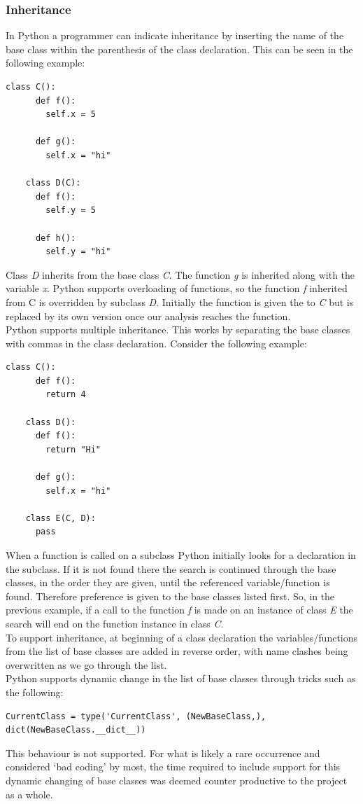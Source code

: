 \documentclass[12pt, titlepage]{article}
\begin{document}
\subsubsection{Inheritance}
In Python a programmer can indicate inheritance by inserting the name of the base class within the parenthesis of the class declaration. This can be seen in the following example:
\begin{lstlisting}[mathescape]
	class C():
	  def f():
	    self.x = 5
		
	  def g():
	    self.x = "hi"

	class D(C):
	  def f():
	    self.y = 5
		
	  def h():
	    self.y = "hi"
\end{lstlisting}
Class \textit{D} inherits from the base class \textit{C}. The function \textit{g} is inherited along with the variable \textit{x}. Python supports overloading of functions, so the function \textit{f} inherited from C is overridden by subclass \textit{D}. Initially the function is given the to \textit{C} but is replaced by its own version once our analysis reaches the function. \\
Python supports multiple inheritance. This works by separating the base classes with commas in the class declaration. Consider the following example: 
\begin{lstlisting}[mathescape]
	class C():
	  def f():
	    return 4
	    
	class D():
	  def f():
	    return "Hi"
	    
	  def g():
	    self.x = "hi"

	class E(C, D):
	  pass
\end{lstlisting}
When a function is called on a subclass Python initially looks for a declaration in the subclass. If it is not found there the search is continued through the base classes, in the order they are given, until the referenced variable/function is found. Therefore preference is given to the base classes listed first. So, in the previous example, if a call to the function \textit{f} is made on an instance of class \textit{E} the search will end on the function instance in class \textit{C}. \\
To support inheritance, at beginning of a class declaration the variables/functions from the list of base classes are added in reverse order, with name clashes being overwritten as we go through the list. \\
Python supports dynamic change in the list of base classes through tricks such as the following:
\begin{lstlisting}[mathescape]
CurrentClass = type('CurrentClass', (NewBaseClass,), dict(NewBaseClass.__dict__))
\end{lstlisting}
This behaviour is not supported. For what is likely a rare occurrence and considered `bad coding' by most, the time required to include support for this dynamic changing of base classes was deemed counter productive to the project as a whole.
\end{document}
